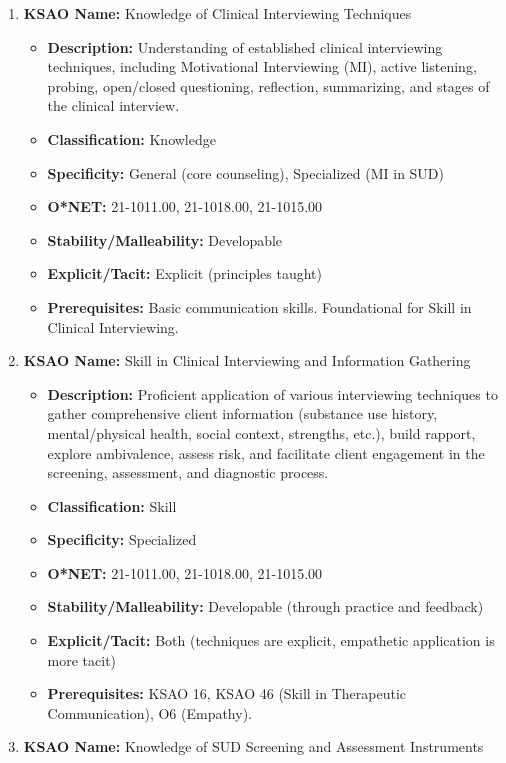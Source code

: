 \documentclass[
  letterpaper,
  DIV=11,
  numbers=noendperiod]{scrartcl}
\providecommand{\tightlist}{%
  \setlength{\itemsep}{0pt}\setlength{\parskip}{0pt}}
\begin{document}
\begin{enumerate}
\def\labelenumi{\arabic{enumi}.}
\setcounter{enumi}{15}
\tightlist
\item
  \textbf{KSAO Name:} Knowledge of Clinical Interviewing Techniques

  \begin{itemize}
  \tightlist
  \item
    \textbf{Description:} Understanding of established clinical
    interviewing techniques, including Motivational Interviewing (MI),
    active listening, probing, open/closed questioning, reflection,
    summarizing, and stages of the clinical interview.
  \item
    \textbf{Classification:} Knowledge
  \item
    \textbf{Specificity:} General (core counseling), Specialized (MI in
    SUD)
  \item
    \textbf{O*NET:} 21-1011.00, 21-1018.00, 21-1015.00
  \item
    \textbf{Stability/Malleability:} Developable
  \item
    \textbf{Explicit/Tacit:} Explicit (principles taught)
  \item
    \textbf{Prerequisites:} Basic communication skills. Foundational for
    Skill in Clinical Interviewing.
  \end{itemize}
\item
  \textbf{KSAO Name:} Skill in Clinical Interviewing and Information
  Gathering

  \begin{itemize}
  \tightlist
  \item
    \textbf{Description:} Proficient application of various interviewing
    techniques to gather comprehensive client information (substance use
    history, mental/physical health, social context, strengths, etc.),
    build rapport, explore ambivalence, assess risk, and facilitate
    client engagement in the screening, assessment, and diagnostic
    process.
  \item
    \textbf{Classification:} Skill
  \item
    \textbf{Specificity:} Specialized
  \item
    \textbf{O*NET:} 21-1011.00, 21-1018.00, 21-1015.00
  \item
    \textbf{Stability/Malleability:} Developable (through practice and
    feedback)
  \item
    \textbf{Explicit/Tacit:} Both (techniques are explicit, empathetic
    application is more tacit)
  \item
    \textbf{Prerequisites:} KSAO 16, KSAO 46 (Skill in Therapeutic
    Communication), O6 (Empathy).
  \end{itemize}
\item
  \textbf{KSAO Name:} Knowledge of SUD Screening and Assessment
  Instruments


\end{enumerate}
\end{document}
